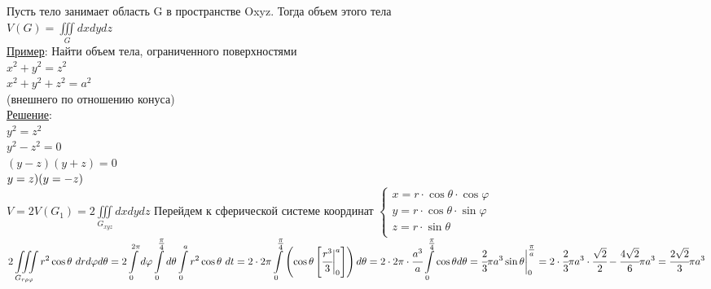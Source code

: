 
Пусть тело занимает область G в пространстве Oxyz. Тогда объем этого тела \\
$\displaystyle  V(G) = \iiint\limits_{G} dxdydz$ \\


\underline{Пример}: Найти объем тела, ограниченного поверхностями \\
$x^2 + y^2 = z^2$ \\
$x^2 + y^2 + z^2 = a^2$ \\
(внешнего по отношению конуса) \\
\underline{Решение}:  \\
$y^2 = z^2$ \\
$y^2 - z^2 = 0$ \\
$(y - z)(y + z) = 0$ \\
$y = z) \\ (y = -z)$ \\
$\displaystyle  V = 2V(G_1) = 2 \iiint\limits_{G_{xyz}} dxdydz$
Перейдем к сферической системе координат
$\begin{cases}
	x = r \cdot \cos{\theta} \cdot \cos{\varphi} \\
	y = r \cdot \cos{\theta} \cdot \sin{\varphi} \\
	z = r \cdot \sin{\theta} \\
\end{cases}$
$\displaystyle  2 \iiint\limits_{G_{r \rho \varphi}}  r^2 \cos{\theta} \ dr d\varphi d\theta = 
2 \int\limits_{0}^{2\pi} d\varphi \int\limits_{0}^{\tfrac{\pi}{4}} d\theta \int\limits_{0}^{a} r^2 \cos{\theta} \ dt = 
2 \cdot 2 \pi \int\limits_{0}^{\tfrac{\pi}{4}} \left( \cos{\theta} \left[ \cfrac{r^3}{3} \bigg|_{0}^{a} \right] \right) d\theta = 
2 \cdot 2 \pi \cdot \cfrac{a^3}{a} \int\limits_{0}^{\tfrac{\pi}{4}} \cos{\theta} d\theta = 
\cfrac{2}{3} \pi a^3 \sin{\theta} \bigg|_{0}^{\tfrac{\pi}{a}} = 
2 \cdot \cfrac{2}{3} \pi a^3 \cdot \cfrac{\sqrt{2}}{2} - \cfrac{4\sqrt{2}}{6} \pi a^3 = \cfrac{2\sqrt{2}}{3} \pi a^3$ \\


